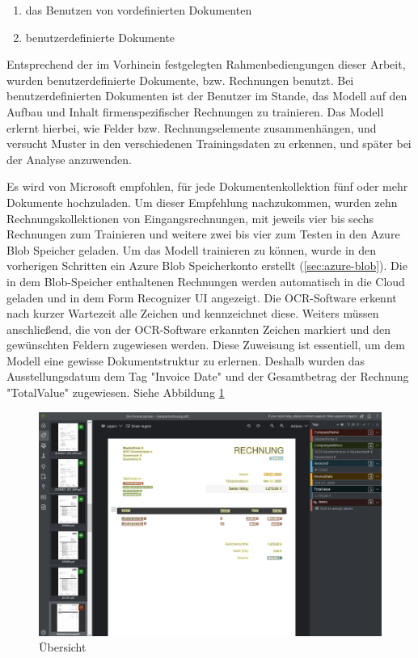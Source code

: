 \begin{enumerate}
    \item das Benutzen von vordefinierten Dokumenten
    \item benutzerdefinierte Dokumente
\end{enumerate}

Entsprechend der im Vorhinein festgelegten Rahmenbediengungen dieser Arbeit, wurden benutzerdefinierte Dokumente, bzw. Rechnungen benutzt.
Bei benutzerdefinierten Dokumenten ist der Benutzer im Stande, das Modell auf den Aufbau und Inhalt firmenspezifischer Rechnungen zu trainieren.
Das Modell erlernt hierbei, wie Felder bzw. Rechnungselemente zusammenhängen, und versucht Muster in den verschiedenen Trainingsdaten zu erkennen, und später
bei der Analyse anzuwenden.

Es wird von Microsoft empfohlen, für jede Dokumentenkollektion fünf oder mehr Dokumente hochzuladen. Um dieser Empfehlung nachzukommen, wurden zehn Rechnungskollektionen von Eingangsrechnungen, mit jeweils vier bis sechs Rechnungen zum Trainieren und weitere zwei bis vier zum Testen in den Azure Blob Speicher geladen. Um das Modell trainieren zu können, wurde in den vorherigen Schritten ein Azure Blob Speicherkonto erstellt (\ref{sec:azure-blob}). Die in dem Blob-Speicher enthaltenen Rechnungen werden automatisch in die Cloud geladen und in dem Form Recognizer UI angezeigt. Die OCR-Software erkennt nach kurzer Wartezeit alle Zeichen und kennzeichnet diese. Weiters müssen anschließend, die von der OCR-Software erkannten Zeichen markiert und den gewünschten Feldern zugewiesen werden. Diese Zuweisung ist essentiell, um dem Modell eine gewisse Dokumentstruktur zu erlernen. Deshalb wurden das Ausstellungsdatum dem Tag "Invoice Date" und der Gesamtbetrag der Rechnung "TotalValue" zugewiesen.
Siehe Abbildung \ref{fig:formrecognizer-invoice-tagging}

\begin{figure}[h]
    \centering
    \includegraphics[scale=0.4]{sections/cloud-computing/images/formrecognizer-invoice-tagging.PNG}
    \caption{Übersicht}
    \label{fig:formrecognizer-invoice-tagging}
\end{figure}

